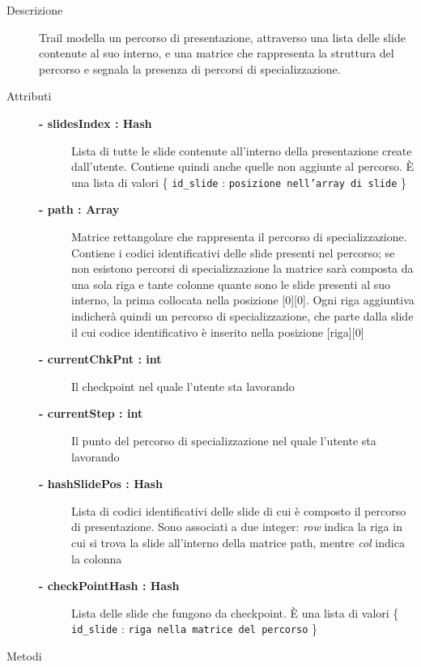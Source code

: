 \begin{description}
\item[Descrizione] \hfill
	Trail modella un percorso di presentazione, attraverso una lista delle slide contenute al suo interno, e una matrice che rappresenta la struttura del percorso e segnala la presenza di percorsi di specializzazione.
	
	

	
	
\item[Attributi] \hfill
	\begin{description}
		\item[\textbf{- slidesIndex : Hash			}] \hfill
			Lista di tutte le slide contenute all'interno della presentazione create dall'utente. Contiene quindi anche quelle non aggiunte al percorso. È una lista di valori \{ \texttt{id\_{}slide} : \texttt{posizione nell'array di slide} \}
		\item[\textbf{- path : Array			}] \hfill
			Matrice rettangolare che rappresenta il percorso di specializzazione. Contiene i codici identificativi delle slide presenti nel percorso; se non esistono percorsi di specializzazione la matrice sarà composta da una sola riga e tante colonne quante sono le slide presenti al suo interno, la prima collocata nella posizione [0][0]. Ogni riga aggiuntiva indicherà quindi un percorso di specializzazione, che parte dalla slide il cui codice identificativo è inserito nella posizione [riga][0]
			\item[\textbf{- currentChkPnt : int			}] \hfill
			Il checkpoint nel quale l'utente sta lavorando
			\item[\textbf{- currentStep : int			}] \hfill
			Il punto del percorso di specializzazione nel quale l'utente sta lavorando
			\item[\textbf{- hashSlidePos : Hash			}] \hfill
			Lista di codici identificativi delle slide di cui è composto il percorso di presentazione. Sono associati a due integer: \textit{row} indica la riga in cui si trova la slide all'interno della matrice path, mentre \textit{col} indica la colonna
			\item[\textbf{- checkPointHash : Hash		}] \hfill
			Lista delle slide che fungono da checkpoint. È una lista di valori  \{ \texttt{id\_{}slide} : \texttt{riga nella matrice del percorso} \}
	\end{description}
	
	
\item[Metodi] \hfill


\end{description}
